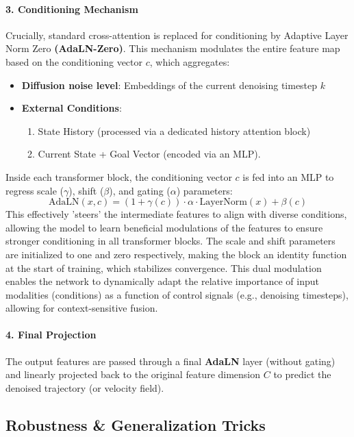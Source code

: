 \paragraph{3. Conditioning Mechanism}\label{conditioning-mechanism-adaln-zero} 

Crucially, standard cross-attention is replaced for conditioning by Adaptive Layer Norm Zero \textbf{(AdaLN-Zero)}. This mechanism modulates the entire feature map based on the conditioning vector \(c\),
which aggregates: 
\begin{itemize}
    \item \textbf{Diffusion noise level}: Embeddings of the current denoising timestep \(k\)
    \item \textbf{External Conditions}: 
    \begin{enumerate}
        \item State History (processed via a dedicated history attention block)
        \item Current State + Goal Vector (encoded via an MLP).
    \end{enumerate}  
\end{itemize}
Inside each transformer block, the conditioning vector \(c\) is fed into
an MLP to regress scale (\(\gamma\)), shift (\(\beta\)), and gating
(\(\alpha\)) parameters:
\[ \text{AdaLN}(x, c) = (1 + \gamma(c)) \cdot \alpha \cdot \text{LayerNorm}(x)  + \beta(c) \]
This effectively 'steers' the intermediate features to align with diverse conditions, allowing the model to learn beneficial modulations of the features to ensure stronger conditioning in all transformer blocks. The scale and shift parameters are initialized to one and zero respectively, making the block an identity function at the start of training, which stabilizes convergence. This dual modulation enables the network to dynamically adapt the relative importance of input modalities (conditions) as a function of control signals (e.g., denoising timesteps), allowing for context-sensitive fusion.


\paragraph{4. Final Projection}\label{final-projection}

The output features are passed through a final \textbf{AdaLN} layer
(without gating) and linearly projected back to the original feature
dimension \(C\) to predict the denoised trajectory (or velocity field).


\subsection{Robustness \& Generalization
Tricks}\label{robustness-generalization-tricks}

